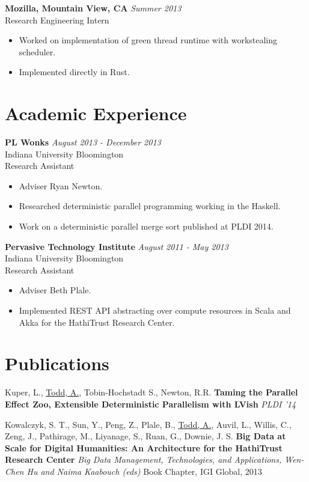 \documentclass[margin]{res}
\begin{document}
\begin{resume}
 {\bf Mozilla, Mountain View, CA} \hfill \textit{Summer 2013} \\
 Research Engineering Intern
 \begin{itemize} \itemsep -2pt  %
 \item Worked on implementation of green thread runtime with workstealing scheduler.
 \item Implemented directly in Rust.  
 \end{itemize}
  
\section{Academic Experience}

 {\bf PL Wonks} \hfill \textit{August 2013 - December 2013} \\
 Indiana University Bloomington \\
 Research Assistant
 \begin{itemize} \itemsep -2pt  %
 \item Adviser Ryan Newton.
 \item Researched deterministic parallel programming working in the Haskell.
 \item Work on a deterministic parallel merge sort published at PLDI 2014.
 \end{itemize}


 {\bf Pervasive Technology Institute} \hfill \textit{August 2011 - May 2013} \\
 Indiana University Bloomington \\
 Research Assistant
 \begin{itemize} \itemsep -2pt  %
 \item Adviser Beth Plale.
 \item Implemented REST API abstracting over compute resources in Scala and Akka for the HathiTrust Research Center.
 \end{itemize}
 
\section{Publications}

Kuper, L., \underline{Todd, A.}, Tobin-Hochstadt S., Newton, R.R. {\bf Taming the Parallel Effect Zoo, Extensible Deterministic Parallelism with LVish} \textit{PLDI '14} 

Kowalczyk, S. T., Sun, Y., Peng, Z., Plale, B., \underline{Todd, A.}, Auvil, L., Willis, C., Zeng, J., Pathirage, M., Liyanage, S., Ruan, G., Downie, J. S. {\bf Big Data at Scale for Digital Humanities: An Architecture for the HathiTrust Research Center} \textit{Big Data Management, Technologies, and Applications, Wen-Chen Hu and Naima Kaabouch (eds)} Book Chapter, IGI Global, 2013


\end{resume}
\end{document}

